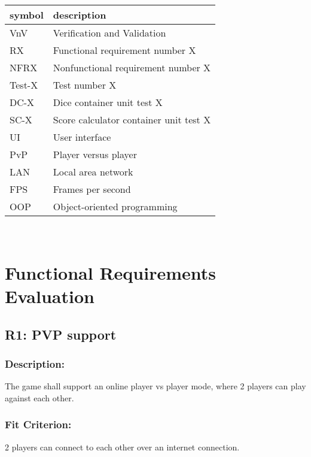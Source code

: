 \documentclass[12pt, titlepage]{article}
\begin{document}
\renewcommand{\arraystretch}{1.2}
\begin{tabular}{l l} 
  \toprule		
  \textbf{symbol} & \textbf{description}\\
  \midrule
  VnV & Verification and Validation\\
  RX & Functional requirement number X\\
  NFRX & Nonfunctional requirement number X\\
  Test-X & Test number X\\
  DC-X & Dice container unit test X\\
  SC-X & Score calculator container unit test X\\
  UI & User interface\\
  PvP & Player versus player\\
  LAN & Local area network\\
  FPS & Frames per second\\
  OOP & Object-oriented programming\\
  \bottomrule
\end{tabular}\\


\newpage

\tableofcontents

\newpage
\listoftables %


\newpage



\section{Functional Requirements Evaluation}


\subsection{R1: PVP support}
\label{R1}

 \subsubsection*{Description:}  The game shall support an online player vs player mode, where 2 players can play against
each other.

 \subsubsection*{Fit Criterion:}  2 players can connect to each other over an internet connection.
 
\end{document}
